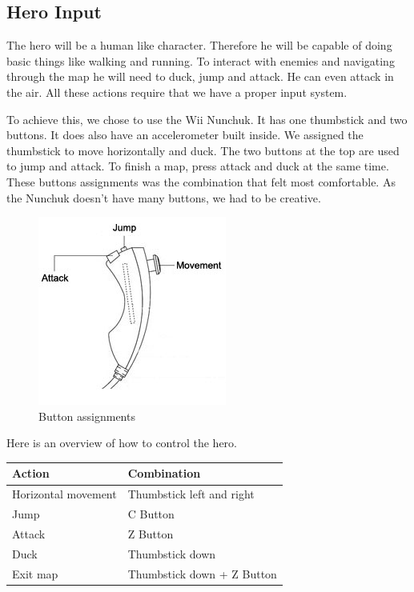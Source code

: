 \subsection{Hero Input} %
The hero will be a human like character. Therefore he will be capable
of doing basic things like walking and running. To interact with enemies
and navigating through the map he will need to duck,
jump and attack. He can even attack in the air.
All these actions require that we have a proper input system.

To achieve this, we chose to use the Wii Nunchuk. It has one thumbstick
and two buttons. It does also have an accelerometer built inside.
We assigned the thumbstick to move horizontally and duck.
The two buttons at the top are used to jump and attack.
To finish a map, press attack and duck at the same time.\\
These buttons assignments
was the combination that felt most comfortable. As the Nunchuk doesn't have many buttons, we had to be creative.

\begin{figure}[H]
  \centering
  \includegraphics[scale=0.6]{Figures/nunchuk}
  \caption{Button assignments}
  \label{fig:Nunchuk}
\end{figure}

Here is an overview of how to control the hero.

\begin{table}[H]
    \centering
    \begin{tabular}{ll}
    Action               & Combination                \\ \hline
    Horizontal movement  & Thumbstick left and right  \\
    Jump                 & C Button                   \\
    Attack               & Z Button                   \\
    Duck                 & Thumbstick down            \\
    Exit map             & Thumbstick down + Z Button \\
    \end{tabular}
\end{table}


